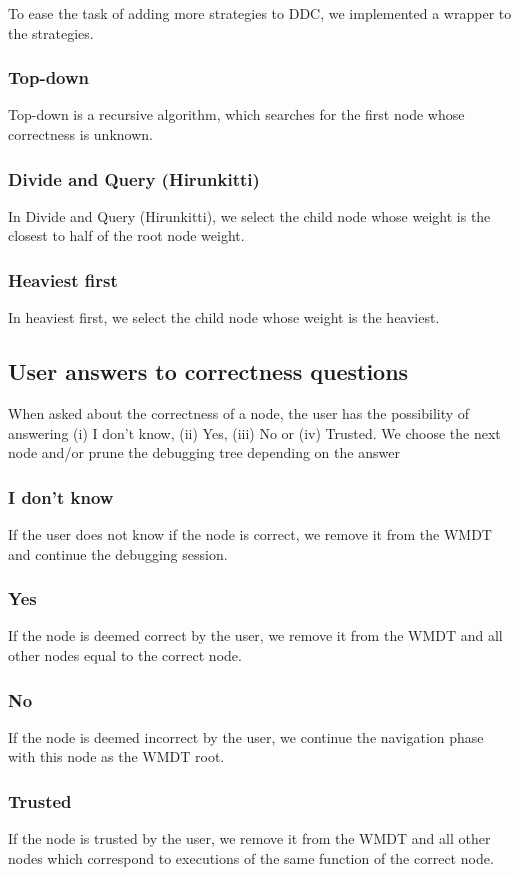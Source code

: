 To ease the task of adding more strategies to DDC, we implemented a wrapper to the strategies.

\subsubsection{Top-down}
Top-down is a recursive algorithm, which searches for the first node whose correctness is unknown.

\subsubsection{Divide and Query (Hirunkitti)}
In Divide and Query (Hirunkitti), we select the child node whose weight is the closest to half of the root node weight.

\subsubsection{Heaviest first}
In heaviest first, we select the child node whose weight is the heaviest.

\subsection{User answers to correctness questions}
\label{implementation:correctnessAnswers}
When asked about the correctness of a node, the user has the possibility of answering (i) I don't know, (ii) Yes, (iii) No or (iv) Trusted.
We choose the next node and/or prune the debugging tree depending on the answer
\subsubsection{I don't know}
If the user does not know if the node is correct, we remove it from the WMDT and continue the debugging session.
\subsubsection{Yes}
If the node is deemed correct by the user, we remove it from the WMDT and all other nodes equal to the correct node.

\subsubsection{No}
If the node is deemed incorrect by the user, we continue the navigation phase with this node as the WMDT root.
\subsubsection{Trusted}
If the node is trusted by the user, we remove it from the WMDT and all other nodes which correspond to executions of the same function of the correct node.


